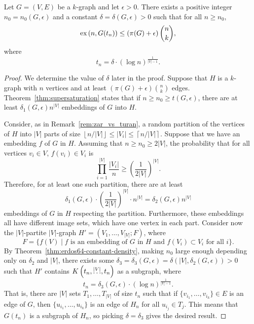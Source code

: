 \begin{theorem} \label{thm:quant-blowup}
    Let $G = (V, E)$ be a $k$-graph and let $\epsilon > 0$.
    There exists a positive integer $n_0 = n_0(G, \epsilon)$ and a constant $\delta = \delta(G, \epsilon) > 0$
    such that for all $n \geq n_0$,
    \[
         \text{ex} \left( n, G(t_n) \right) \leq \left( \pi(G) + \epsilon \right) \binom{n}{k},
    \]
    where
    \[
        t_n = \delta \cdot (\log n)^{\frac{1}{|V|-1}}.
    \]
    \begin{proof}

        We determine the value of $\delta$ later in the proof.
        Suppose that $H$ is a $k$-graph with $n$ vertices and at least $(\pi(G) + \epsilon) \binom{n}{k}$ edges.
        Theorem~\ref{thm:supersaturation} states that if $n \geq n_0 \geq t(G, \epsilon)$,
        there are at least $\delta_1(G, \epsilon) n^{|V|}$ embeddings of $G$ into $H$.

        Consider, as in Remark~\ref{rem:zar_vs_turan},
        a random partition of the vertices of $H$ into $|V|$ parts of size
        $\left\lfloor n / |V| \right\rfloor  \leq |V_i| \leq \left\lceil n / |V|  \right\rceil$.
        Suppose that we have an embedding $f$ of $G$ in $H$.
        Assuming that $n \geq n_0 \geq 2|V|$,
        the probability that for all vertices $v_i \in V$, $f(v_i) \in V_i$ is
        \[
            \prod_{i=1}^{|V|} \frac{|V_i|}{n} \geq \left( \frac{1}{2|V|} \right)^{|V|}.
        \]
        Therefore, for at least one such partition, there are at least
        \[
            \delta_1(G, \epsilon) \cdot \left( \frac{1}{2|V|} \right)^{|V|} \cdot n^{|V|} = \delta_2(G, \epsilon) n^{|V|}
        \]
        embeddings of $G$ in $H$ respecting the partition.
        Furthermore, these embeddings all have different image sets, which have one vertex in each part.
        Consider now the $|V|$-partite $|V|$-graph $H' = (V_1, \dots, V_{|V|}; F)$,
        where
        \[
            F = \{f(V) \mid f \text{ is an embedding of } G \text{ in } H \text{ and } f(V_i) \subset V_i \text{ for all } i\}.
        \]
        By Theorem~\ref{thm:erdos64-constant-density}, making $n_0$ large enough depending only on $\delta_2$ and $|V|$,
        there exists some $\delta_3 = \delta_3(G, \epsilon) = \delta(|V|, \delta_2(G, \epsilon)) > 0$ such that
        $H'$ contains $K\left(t_n, \overset{|V|}{\dots}, t_n\right)$ as a subgraph, where
        \[
            t_n = \delta_3(G, \epsilon) \cdot (\log n)^{\frac{1}{|V|-1}}.
        \]
        That is, there are $|V|$ sets $T_1, \dots, T_{|V|}$ of size $t_n$ such that
        if $\{v_{i_1}, \dots, v_{i_k}\} \in E$ is an edge of $G$, then
        $\{u_{i_1}, \dots, u_{i_k}\}$ is an edge of $H_n$ for all $u_{i_j} \in T_j$.
        This means that $G(t_n)$ is a subgraph of $H_n$, so picking $\delta = \delta_3$
        gives the desired result.

    \end{proof}
\end{theorem}

